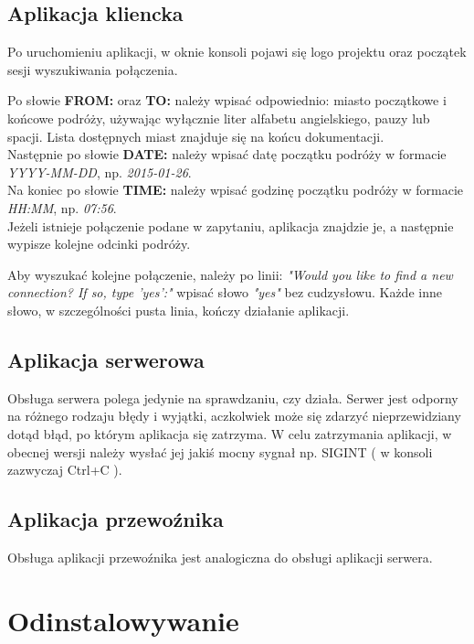 \documentclass[pdftex,13pt,a4paper]{article}
\begin{document}
\subsection{Aplikacja kliencka}
	Po uruchomieniu aplikacji, w oknie konsoli pojawi się logo projektu oraz początek sesji wyszukiwania połączenia.
	
	Po słowie \textbf{FROM:} oraz \textbf{TO:} należy wpisać odpowiednio: miasto początkowe i końcowe podróży, używając wyłącznie liter alfabetu angielskiego, pauzy lub spacji. Lista dostępnych miast znajduje się na końcu dokumentacji.\\
	
	Następnie po słowie \textbf{DATE:} należy wpisać datę początku podróży w formacie \emph{YYYY-MM-DD}, np. \emph{2015-01-26}.\\
	
	Na koniec po słowie \textbf{TIME:} należy wpisać godzinę początku podróży w formacie \emph{HH:MM}, np. \emph{07:56}.\\
	
	Jeżeli istnieje połączenie podane w zapytaniu, aplikacja znajdzie je, a następnie wypisze kolejne odcinki podróży.
	
	Aby wyszukać kolejne połączenie, należy po linii: \textit{"Would you like to find a new connection? If so, type 'yes':"} wpisać słowo \textit{"yes"} bez cudzysłowu. Każde inne słowo, w szczególności pusta linia, kończy działanie aplikacji. 
	
\subsection{Aplikacja serwerowa}
	Obsługa serwera polega jedynie na sprawdzaniu, czy działa. Serwer jest odporny na różnego rodzaju błędy i wyjątki, aczkolwiek może się zdarzyć nieprzewidziany dotąd błąd, po którym aplikacja się zatrzyma. W celu zatrzymania aplikacji, w obecnej wersji należy wysłać jej jakiś mocny sygnał np. SIGINT ( w konsoli zazwyczaj Ctrl+C ).

\subsection{Aplikacja przewoźnika}
	Obsługa aplikacji przewoźnika jest analogiczna do obsługi aplikacji serwera.
	
\section{Odinstalowywanie}
\end{document}
